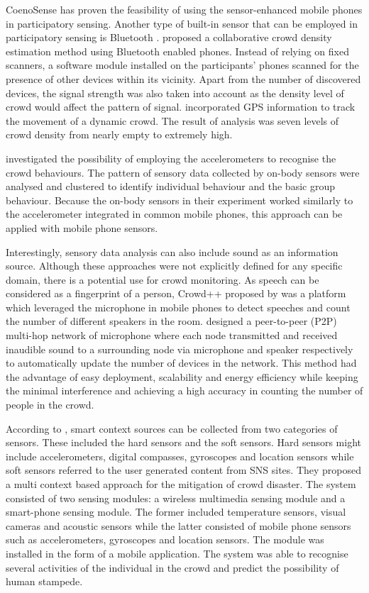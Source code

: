 CoenoSense has proven the feasibility of using the sensor-enhanced mobile phones in participatory sensing. Another type of built-in sensor that can be employed in participatory sensing is Bluetooth \parencite{Stopczynski2013,Weppner2011,Weppner2013}. \textcite{Weppner2011} proposed a collaborative crowd density estimation method using Bluetooth enabled phones. Instead of relying on fixed scanners, a software module installed on the participants’ phones scanned for the presence of other devices within its vicinity. Apart from the number of discovered devices, the signal strength was also taken into account as the density level of crowd would affect the pattern of signal. \textcite{Weppner2013} incorporated GPS information to track the movement of a dynamic crowd. The result of analysis was seven levels of crowd density from nearly empty to extremely high.

\textcite{Roggen2011} investigated the possibility of employing the accelerometers to recognise the crowd behaviours. The pattern of sensory data collected by on-body sensors were analysed and clustered to identify individual behaviour and the basic group behaviour. Because the on-body sensors in their experiment worked similarly to the accelerometer integrated in common mobile phones, this approach can be applied with mobile phone sensors.

Interestingly, sensory data analysis can also include sound as an information source. Although these approaches were not explicitly defined for any specific domain, there is a potential use for crowd monitoring. As speech can be considered as a fingerprint of a person, Crowd++ proposed by \textcite{Xu2013} was a platform which leveraged the microphone in mobile phones to detect speeches and count the number of different speakers in the room. \textcite{Kannan2012} designed a peer-to-peer (P2P) multi-hop network of microphone where each node transmitted and received inaudible sound to a surrounding node via microphone and speaker respectively to automatically update the number of devices in the network. This method had the advantage of easy deployment, scalability and energy efficiency while keeping the minimal interference and achieving a high accuracy in counting the number of people in the crowd.

According to \textcite{Ramesh2014}, smart context sources can be collected from two categories of sensors. These included the hard sensors and the soft sensors. Hard sensors might include accelerometers, digital compasses, gyroscopes and location sensors while soft sensors referred to the user generated content from SNS sites. They proposed a multi context based approach for the mitigation of crowd disaster. The system consisted of two sensing modules: a wireless multimedia sensing module and a smart-phone sensing module. The former included temperature sensors, visual cameras and acoustic sensors while the latter consisted of mobile phone sensors such as accelerometers, gyroscopes and location sensors. The module was installed in the form of a mobile application. The system was able to recognise several activities of the individual in the crowd and predict the possibility of human stampede.

